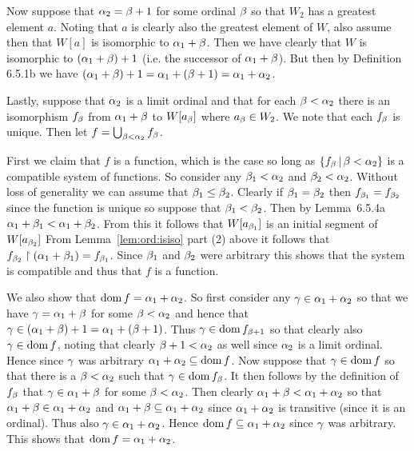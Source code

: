 \begin{questions}
{{    Now suppose that $\alpha_2 = \beta+1$ for some ordinal $\beta$ so that $W_2$ has a greatest element $a$.
    Noting that $a$ is clearly also the greatest element of $W$, also assume then that $W[a]$ is isomorphic to $\alpha_1 + \beta$.
    Then we have clearly that $W$ is isomorphic to $(\alpha_1 + \beta) + 1$ (i.e. the successor of $\alpha_1 + \beta$).
    But then by Definition 6.5.1b we have $(\alpha_1 + \beta) + 1 = \alpha_1 + (\beta+ 1) = \alpha_1 + \alpha_2$.

    Lastly, suppose that $\alpha_2$ is a limit ordinal and that for each $\beta < \alpha_2$ there is an isomorphism $f_\beta$ from $\alpha_1 + \beta$ to $W[a_\beta]$ where $a_\beta \in W_2$.
    We note that each $f_\beta$ is unique.
    Then let $f = \bigcup_{\beta < \alpha_2} f_\beta$.

    First we claim that $f$ is a function, which is the case so long as $\left\{ f_\beta \,|\, \beta < \alpha_2 \right\}$ is a compatible system of functions.
    So consider any $\beta_1 < \alpha_2$ and $\beta_2 < \alpha_2$.
    Without loss of generality we can assume that $\beta_1 \leq \beta_2$.
    Clearly if $\beta_1 = \beta_2$ then $f_{\beta_1} = f_{\beta_2}$ since the function is unique so suppose that $\beta_1 < \beta_2$.
    Then by Lemma~6.5.4a $\alpha_1 + \beta_1 < \alpha_1 + \beta_2$.
    From this it follows that $W[a_{\beta_1}]$ is an initial segment of $W[a_{\beta_2}]$
    From Lemma~\ref{lem:ord:isiso} part (2) above it follows that $f_{\beta_2} \restriction (\alpha_1 + \beta_1) = f_{\beta_1}$.
    Since $\beta_1$ and $\beta_2$ were arbitrary this shows that the system is compatible and thus that $f$ is a function.

    We also show that  $\mathrm{dom}\, f = \alpha_1 + \alpha_2$.
    So first consider any $\gamma \in \alpha_1 + \alpha_2$ so that we have $\gamma = \alpha_1 + \beta$ for some $\beta < \alpha_2$ and hence that $\gamma \in (\alpha_1 + \beta) + 1 = \alpha_1 + (\beta + 1)$.
    Thus $\gamma \in \mathrm{dom}\, f_{\beta+1}$ so that clearly also $\gamma \in \mathrm{dom}\, f$, noting that clearly $\beta+1 < \alpha_2$ as well since $\alpha_2$ is a limit ordinal.
    Hence since $\gamma$ was arbitrary $\alpha_1 + \alpha_2 \subseteq \mathrm{dom}\, f$.
    Now suppose that $\gamma \in \mathrm{dom}\, f$ so that there is a $\beta < \alpha_2$ such that $\gamma \in \mathrm{dom}\, f_\beta$.
    It then follows by the definition of $f_\beta$ that $\gamma \in \alpha_1 + \beta$ for some $\beta < \alpha_2$.
    Then clearly $\alpha_1 + \beta < \alpha_1 + \alpha_2$ so that $\alpha_1 + \beta \in \alpha_1 + \alpha_2$ and $\alpha_1 + \beta \subseteq \alpha_1 + \alpha_2$ since $\alpha_1 + \alpha_2$ is transitive (since it is an ordinal).
    Thus also $\gamma \in \alpha_1 + \alpha_2$.
    Hence $\mathrm{dom}\, f \subseteq \alpha_1 + \alpha_2$ since $\gamma$ was arbitrary.
    This shows that $\mathrm{dom}\, f = \alpha_1 + \alpha_2$.

}}
\end{questions}
